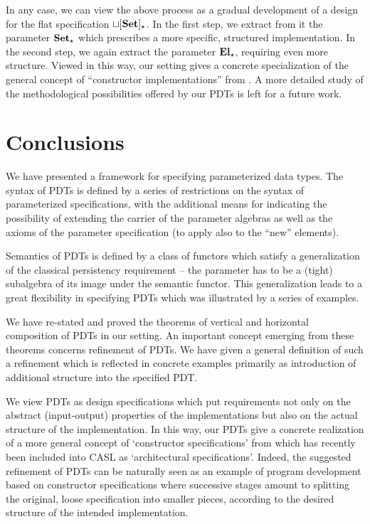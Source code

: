 In any case, we can view the above process as a gradual development of a
design for the flat specification ${\bf \sqcup[Set]_\star}$. In the first
step, we extract from it the parameter ${\bf Set_\star}$ which prescribes a
more specific, structured implementation. In the second step, we again extract
the parameter ${\bf El_\star}$, requiring even more structure. Viewed in this
way, our setting gives a concrete specialization of the general concept of
``constructor implementations'' from \cite{para1}. A more detailed study of
the methodological possibilities offered by our PDTs is left for a future work.

\section{Conclusions}\label{se:conc}
We have presented a framework for specifying parameterized data types. The
syntax of PDTs is defined by a series of restrictions on the
syntax of parameterized specifications, with the additional means for indicating
the possibility of extending the carrier of the parameter algebras as well as
the axioms of the parameter specification (to apply also to the ``new''
elements). 

Semantics of PDTs is defined by a class of functors which satisfy a
generalization of the classical persistency requirement -- the parameter
has to be a (tight) subalgebra of its image under the semantic functor. This
generalization leads to a great flexibility in specifying PDTs which was
illustrated by a series of examples. 

We have re-stated and proved the theorems of vertical and horizontal
composition of PDTs in our setting. An important concept emerging from these
theorems concerns refinement of PDTs. We have given a general definition of
such a refinement which is reflected in concrete examples primarily as introduction of
additional structure into the specified PDT.

We view PDTs as design
specifications which put requirements not only on the abstract (input-output)
properties of the implementations but also on the actual structure of the
implementation. In this way, our PDTs give a concrete realization of a more
general concept of `constructor specifications' from \cite{para1} which has
recently been included into CASL \cite{CASL} as `architectural
specifications'. Indeed, the suggested refinement of PDTs can be naturally seen as an
example of program development based on constructor specifications where
successive stages amount to splitting the original, loose specification into
smaller pieces, 
according to the desired structure of the intended implementation.

